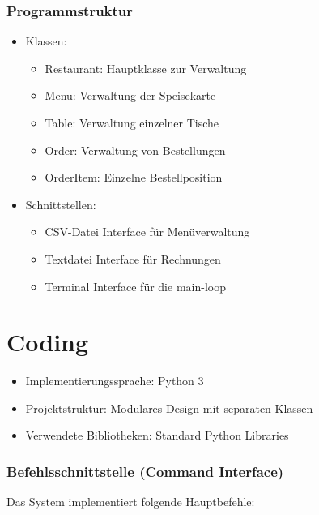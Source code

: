 \documentclass[a4paper,11pt]{article}
\begin{document}
\subsubsection{Programmstruktur}
\begin{itemize}
    \item Klassen:
    \begin{itemize}
        \item Restaurant: Hauptklasse zur Verwaltung
        \item Menu: Verwaltung der Speisekarte
        \item Table: Verwaltung einzelner Tische
        \item Order: Verwaltung von Bestellungen
        \item OrderItem: Einzelne Bestellposition
    \end{itemize}
    \item Schnittstellen:
    \begin{itemize}
        \item CSV-Datei Interface für Menüverwaltung
        \item Textdatei Interface für Rechnungen
        \item Terminal Interface für die main-loop
    \end{itemize}
\end{itemize}

\section{Coding}
\begin{itemize}
    \item Implementierungssprache: Python 3
    \item Projektstruktur: Modulares Design mit separaten Klassen
    \item Verwendete Bibliotheken: Standard Python Libraries
\end{itemize}

\subsubsection{Befehlsschnittstelle (Command Interface)}
Das System implementiert folgende Hauptbefehle:
\end{document}
